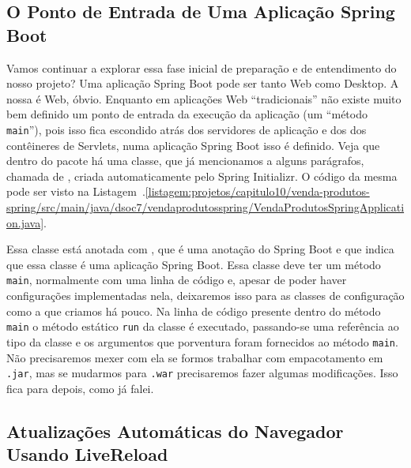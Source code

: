 \subsection{O Ponto de Entrada de Uma Aplicação Spring Boot}

Vamos continuar a explorar essa fase inicial de preparação e de entendimento do nosso projeto? Uma aplicação Spring Boot pode ser tanto Web como Desktop. A nossa é Web, óbvio. Enquanto em aplicações Web ``tradicionais'' não existe muito bem definido um ponto de entrada da execução da aplicação (um ``método \texttt{main}''), pois isso fica escondido atrás dos servidores de aplicação e dos dos contêineres de Servlets, numa aplicação Spring Boot isso é definido. Veja que dentro do pacote  há uma classe, que já mencionamos a alguns parágrafos, chamada de , criada automaticamente pelo Spring Initializr. O código da mesma pode ser visto na Listagem~\thechapter.\ref{listagem:projetos/capitulo10/venda-produtos-spring/src/main/java/dsoc7/vendaprodutosspring/VendaProdutosSpringApplication.java}.


Essa classe está anotada com , que é uma anotação do Spring Boot e que indica que essa classe é uma aplicação Spring Boot. Essa classe deve ter um método \texttt{main}, normalmente com uma linha de código e, apesar de poder haver configurações implementadas nela, deixaremos isso para as classes de configuração como a  que criamos há pouco. Na linha de código presente dentro do método \texttt{main} o método estático \texttt{run} da classe  é executado, passando-se uma referência ao tipo da classe  e os argumentos que porventura foram fornecidos ao método \texttt{main}. Não precisaremos mexer com ela se formos trabalhar com empacotamento em \texttt{.jar}, mas se mudarmos para \texttt{.war} precisaremos fazer algumas modificações. Isso fica para depois, como já falei.


\subsection{Atualizações Automáticas do Navegador Usando LiveReload}

